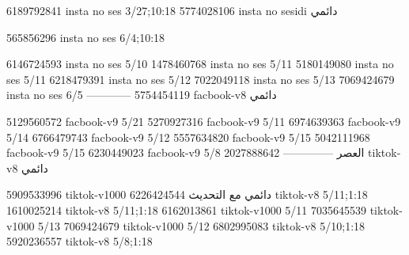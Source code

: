 
6189792841 insta no ses
3/27;10:18
5774028106 insta no sesidi
دائمي


565856296 insta no ses
6/4;10:18


6146724593 insta no ses
5/10
1478460768 insta no ses
5/11
5180149080 insta no ses
5/11
6218479391 insta no ses
5/12
7022049118 insta no ses
5/13
7069424679 insta no ses
6/5
------------
5754454119 facbook-v8
دائمي

5129560572 facbook-v9
5/21
5270927316 facbook-v9
5/11
6974639363 facbook-v9
5/14
6766479743 facbook-v9
5/12
5557634820 facbook-v9
5/15
5042111968 facbook-v9
5/15
6230449023 facbook-v9
5/8 العصر
--------------
2027888642 tiktok-v8
دائمي

5909533996 tiktok-v1000
دائمي مع التحديث
6226424544 tiktok-v8
5/11;1:18
1610025214 tiktok-v8
5/11;1:18
6162013861 tiktok-v1000
5/11
7035645539 tiktok-v1000
5/13
7069424679 tiktok-v1000
5/12
6802995083 tiktok-v8
5/10;1:18
5920236557 tiktok-v8
5/8;1:18
